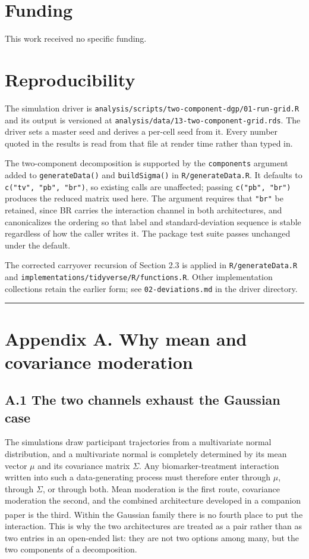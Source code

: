 \documentclass[
  11pt,
]{article}
\begin{document}
\section{Funding}

This work received no specific funding.

\section{Reproducibility}

The simulation driver is
\texttt{analysis/scripts/two-component-dgp/01-run-grid.R} and its
output is versioned at
\texttt{analysis/data/13-two-component-grid.rds}. The driver sets a
master seed and derives a per-cell seed from it. Every number quoted
in the results is read from that file at render time rather than
typed in.

The two-component decomposition is supported by the
\texttt{components} argument added to \texttt{generateData()} and
\texttt{buildSigma()} in \texttt{R/generateData.R}. It defaults to
\texttt{c("tv", "pb", "br")}, so existing calls are unaffected;
passing \texttt{c("pb", "br")} produces the reduced matrix used here.
The argument requires that \texttt{"br"} be retained, since BR
carries the interaction channel in both architectures, and
canonicalizes the ordering so that label and standard-deviation
sequence is stable regardless of how the caller writes it. The
package test suite passes unchanged under the default.

The corrected carryover recursion of Section 2.3 is applied in
\texttt{R/generateData.R} and
\texttt{implementations/tidyverse/R/functions.R}. Other
implementation collections retain the earlier form; see
\texttt{02-deviations.md} in the driver directory.

\bigskip\noindent

\rule{\textwidth}{0.4pt}\bigskip

\section{Appendix A. Why mean and covariance moderation}

\subsection{A.1 The two channels exhaust the Gaussian case}

The simulations draw participant trajectories from a multivariate
normal distribution, and a multivariate normal is completely
determined by its mean vector \(\mu\) and its covariance matrix
\(\Sigma\). Any biomarker-treatment interaction written into such a
data-generating process must therefore enter through \(\mu\), through
\(\Sigma\), or through both. Mean moderation is the first route,
covariance moderation the second, and the combined architecture
developed in a companion paper\textsuperscript{} is the third.
Within the Gaussian family there is no fourth place to put the
interaction. This is why the two architectures are treated as a pair
rather than as two entries in an open-ended list: they are not two
options among many, but the two components of a decomposition.
\end{document}

